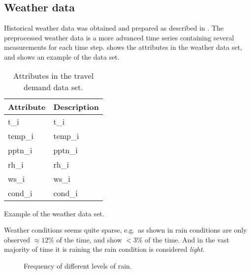 
\subsection{Weather data}\label{ch:desc_weather}
Historical weather data was obtained and prepared as described in . The preprocessed weather data is a more advanced time series containing several measurements for each time step.  shows the attributes in the weather data set, and  shows an example of the data set.

\begin{table}[!ht]
    \center
    \begin{tabular}{p{.7in}p{4.5in}}        
        Attribute & Description \\
        \hline 
        \hline 
        \gls{t_i} & \glsdesc{t_i} \\
        \hline         
        \gls{temp_i} &  \glsdesc{temp_i}  \\
        \hline         
        \gls{pptn_i} & \glsdesc{pptn_i}\\
        \hline         
        \gls{rh_i} & \glsdesc{rh_i} \\
        \hline         
        \gls{ws_i} & \glsdesc{ws_i} \\
        \hline         
        \gls{cond_i} & \glsdesc{cond_i} \\
    \end{tabular}
    \caption{Attributes in the travel demand data set.}
    \label{tab:weather_data_attr}
\end{table}

\begin{table}[!ht]
    \center
    
    \caption{Example of the weather data set.}
    \label{tab:weather_data_example}
\end{table}

Weather conditions seems quite sparse, e.g.\ as shown in  rain conditions are only observed $\approx12 \%$ of the time, and show $<3 \%$ of the time. And in the vast majority of time it is raining the rain condition is considered \emph{light}.

\begin{figure}[!ht]
    \center
    
    \caption{Frequency of different levels of rain.}
    \label{fig:weather_hist}
\end{figure}